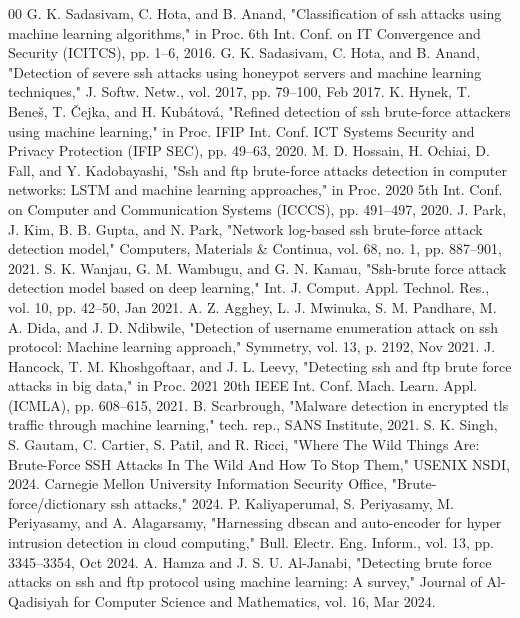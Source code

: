 \documentclass[conference]{IEEEtran}
\begin{document}
\begin{thebibliography}{00}
 G. K. Sadasivam, C. Hota, and B. Anand, "Classification of ssh attacks using machine learning algorithms," in Proc. 6th Int. Conf. on IT Convergence and Security (ICITCS), pp. 1–6, 2016.  
 G. K. Sadasivam, C. Hota, and B. Anand, "Detection of severe ssh attacks using honeypot servers and machine learning techniques," J. Softw. Netw., vol. 2017, pp. 79–100, Feb 2017.  
 K. Hynek, T. Beneš, T. Čejka, and H. Kubátová, "Refined detection of ssh brute-force attackers using machine learning," in Proc. IFIP Int. Conf. ICT Systems Security and Privacy Protection (IFIP SEC), pp. 49–63, 2020.  
 M. D. Hossain, H. Ochiai, D. Fall, and Y. Kadobayashi, "Ssh and ftp brute-force attacks detection in computer networks: LSTM and machine learning approaches," in Proc. 2020 5th Int. Conf. on Computer and Communication Systems (ICCCS), pp. 491–497, 2020.  
 J. Park, J. Kim, B. B. Gupta, and N. Park, "Network log-based ssh brute-force attack detection model," Computers, Materials \& Continua, vol. 68, no. 1, pp. 887–901, 2021.  
 S. K. Wanjau, G. M. Wambugu, and G. N. Kamau, "Ssh-brute force attack detection model based on deep learning," Int. J. Comput. Appl. Technol. Res., vol. 10, pp. 42–50, Jan 2021.  
 A. Z. Agghey, L. J. Mwinuka, S. M. Pandhare, M. A. Dida, and J. D. Ndibwile, "Detection of username enumeration attack on ssh protocol: Machine learning approach," Symmetry, vol. 13, p. 2192, Nov 2021.  
 J. Hancock, T. M. Khoshgoftaar, and J. L. Leevy, "Detecting ssh and ftp brute force attacks in big data," in Proc. 2021 20th IEEE Int. Conf. Mach. Learn. Appl. (ICMLA), pp. 608–615, 2021.  
 B. Scarbrough, "Malware detection in encrypted tls traffic through machine learning," tech. rep., SANS Institute, 2021.  
 S. K. Singh, S. Gautam, C. Cartier, S. Patil, and R. Ricci, "Where The Wild Things Are: Brute-Force SSH Attacks In The Wild And How To Stop Them," USENIX NSDI, 2024.  
 Carnegie Mellon University Information Security Office, "Brute-force/dictionary ssh attacks," 2024.  
 P. Kaliyaperumal, S. Periyasamy, M. Periyasamy, and A. Alagarsamy, "Harnessing dbscan and auto-encoder for hyper intrusion detection in cloud computing," Bull. Electr. Eng. Inform., vol. 13, pp. 3345–3354, Oct 2024.  
 A. Hamza and J. S. U. Al-Janabi, "Detecting brute force attacks on ssh and ftp protocol using machine learning: A survey," Journal of Al-Qadisiyah for Computer Science and Mathematics, vol. 16, Mar 2024.  

\end{thebibliography}
\end{document}
